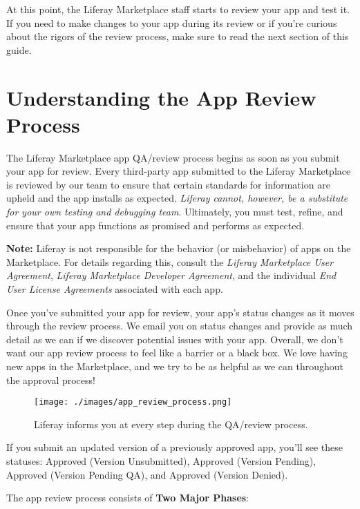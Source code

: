 At this point, the Liferay Marketplace staff starts to review your app
and test it. If you need to make changes to your app during its review
or if you're curious about the rigors of the review process, make sure
to read the next section of this guide.

\chapter{Understanding the App Review
Process}\label{understanding-the-app-review-process}

The Liferay Marketplace app QA/review process begins as soon as you
submit your app for review. Every third-party app submitted to the
Liferay Marketplace is reviewed by our team to ensure that certain
standards for information are upheld and the app installs as expected.
\emph{Liferay cannot, however, be a substitute for your own testing and
debugging team}. Ultimately, you must test, refine, and ensure that your
app functions as promised and performs as expected.

\noindent\hrulefill

\textbf{Note:} Liferay is not responsible for the behavior (or
misbehavior) of apps on the Marketplace. For details regarding this,
consult the \emph{Liferay Marketplace User Agreement}, \emph{Liferay
Marketplace Developer Agreement}, and the individual \emph{End User
License Agreements} associated with each app.

\noindent\hrulefill

Once you've submitted your app for review, your app's status changes as
it moves through the review process. We email you on status changes and
provide as much detail as we can if we discover potential issues with
your app. Overall, we don't want our app review process to feel like a
barrier or a black box. We love having new apps in the Marketplace, and
we try to be as helpful as we can throughout the approval process!

\begin{figure}
\centering
\texttt{[image: ./images/app\_review\_process.png]}
\caption{Liferay informs you at every step during the QA/review
process.}
\end{figure}

If you submit an updated version of a previously approved app, you'll
see these statuses: Approved (Version Unsubmitted), Approved (Version
Pending), Approved (Version Pending QA), and Approved (Version Denied).

The app review process consists of \textbf{Two Major Phases}:


